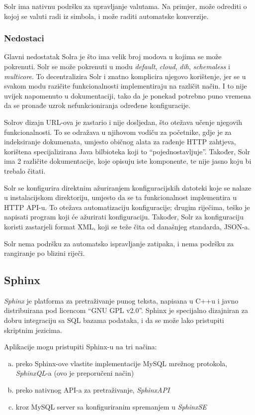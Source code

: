 \documentclass[a4paper,twoside,12pt]{scrreprt}
\begin{document}
Solr ima nativnu podršku za upravljanje valutama. Na primjer, može odrediti o kojoj se valuti radi iz simbola, i može raditi automatske konverzije.

\subsubsection{Nedostaci}

Glavni nedostatak Solra je što ima velik broj modova u kojima se može pokrenuti. Solr se može pokrenuti u modu \textit{default}, \textit{cloud}, \textit{dih}, \textit{schemaless} i \textit{multicore}. To decentralizira Solr i znatno komplicira njegovo korištenje, jer se u svakom modu razičite funkcionalnosti implementiraju na različit način. I to nije uvijek napomenuto u dokumentaciji, tako da je ponekad potrebno puno vremena da se pronađe uzrok nefunkcioniranja određene konfiguracije.

Solrov dizajn URL-ova je zastario i nije dosljedan, što otežava učenje njegovih funkcionalnosti. To se odražava u njihovom vodiču za početnike, gdje je za indeksiranje dokumenata, umjesto običnog alata za rađenje HTTP zahtjeva, korištena specijalizirana Java bilbioteka koji to ``pojednostavljuje''. Također, Solr ima 2 različite dokumentacije, koje opisuju iste komponente, te nije jasno koju bi trebalo čitati.

Solr se konfigurira direktnim ažuriranjem konfiguracijskih datoteki koje se nalaze u instalacijskom direktoriju, umjesto da se ta funkcionalnost implementira u HTTP API-u. To otežava automatizaciju konfiguracije; drugim riječima, teško je napisati program koji će ažurirati konfiguraciju. Također, Solr za konfiguraciju koristi zastarjeli format XML, koji se teže čita od današnjeg standarda, JSON-a.

Solr nema podršku za automatsko ispravljanje zatipaka, i nema podršku za rangiranje po blizini riječi.

\subsection{Sphinx}

\textit{Sphinx} je platforma za pretraživanje punog teksta, napisana u C++u i javno distribuirana pod licencom ``GNU GPL v2.0''. Sphinx je specijalno dizajniran za dobru integraciju sa SQL bazama podataka, i da se može lako pristupiti skriptnim jezicima.

Aplikacije mogu pristupiti Sphinx-u na tri načina:

\begin{enumerate}[(a)]
  \item preko Sphinx-ove vlastite implementacije MySQL mrežnog protokola, \textit{SphinxQL}-a (ovo je preporučeni način)
  \item preko nativnog API-a za pretraživanje, \textit{SphinxAPI}
  \item kroz MySQL server sa konfiguriranim spremanjem u \textit{SphinxSE}
\end{enumerate}
\end{document}
